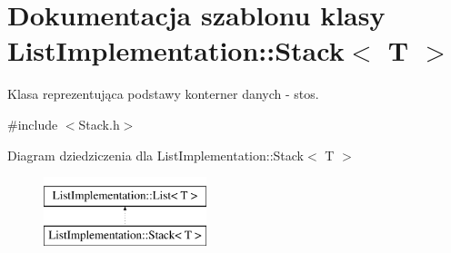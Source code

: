 \hypertarget{class_list_implementation_1_1_stack}{\section{Dokumentacja szablonu klasy List\-Implementation\-:\-:Stack$<$ T $>$}
\label{class_list_implementation_1_1_stack}
}


Klasa reprezentująca podstawy konterner danych -\/ stos.  




{\ttfamily \#include $<$Stack.\-h$>$}

Diagram dziedziczenia dla List\-Implementation\-:\-:Stack$<$ T $>$\begin{figure}[H]
\begin{center}
\leavevmode
\includegraphics[height=2.000000cm]{class_list_implementation_1_1_stack}
\end{center}
\end{figure}
